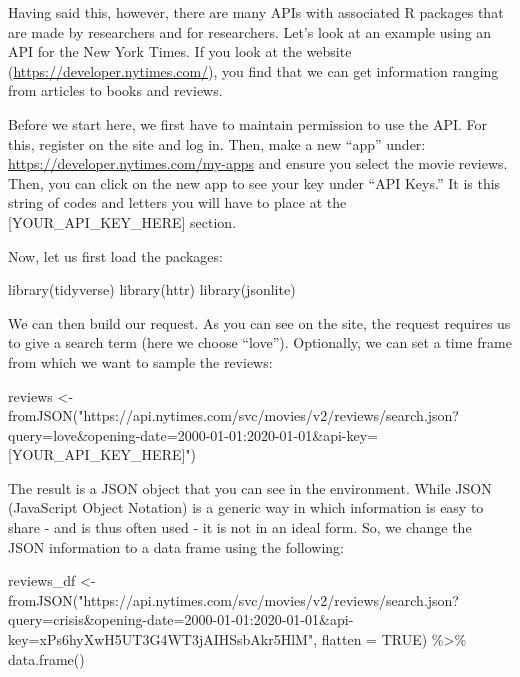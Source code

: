 \documentclass[
]{book}
\newenvironment{Shaded}{\begin{snugshade}}{\end{snugshade}}
\newcommand{\AttributeTok}[1]{\textcolor[rgb]{0.77,0.63,0.00}{#1}}
\newcommand{\ConstantTok}[1]{\textcolor[rgb]{0.00,0.00,0.00}{#1}}
\newcommand{\FunctionTok}[1]{\textcolor[rgb]{0.00,0.00,0.00}{#1}}
\newcommand{\NormalTok}[1]{#1}
\newcommand{\OtherTok}[1]{\textcolor[rgb]{0.56,0.35,0.01}{#1}}
\newcommand{\SpecialCharTok}[1]{\textcolor[rgb]{0.00,0.00,0.00}{#1}}
\newcommand{\StringTok}[1]{\textcolor[rgb]{0.31,0.60,0.02}{#1}}
\begin{document}
Having said this, however, there are many APIs with associated R packages that are made by researchers and for researchers. Let's look at an example using an API for the New York Times. If you look at the website (\url{https://developer.nytimes.com/}), you find that we can get information ranging from articles to books and reviews.

Before we start here, we first have to maintain permission to use the API. For this, register on the site and log in. Then, make a new ``app'' under: \url{https://developer.nytimes.com/my-apps} and ensure you select the movie reviews. Then, you can click on the new app to see your key under ``API Keys.'' It is this string of codes and letters you will have to place at the {[}YOUR\_API\_KEY\_HERE{]} section.

Now, let us first load the packages:

\begin{Shaded}
\begin{Highlighting}[]
\FunctionTok{library}\NormalTok{(tidyverse)}
\FunctionTok{library}\NormalTok{(httr)}
\FunctionTok{library}\NormalTok{(jsonlite)}
\end{Highlighting}
\end{Shaded}

We can then build our request. As you can see on the site, the request requires us to give a search term (here we choose ``love''). Optionally, we can set a time frame from which we want to sample the reviews:

\begin{Shaded}
\begin{Highlighting}[]
\NormalTok{reviews }\OtherTok{\textless{}{-}}  \FunctionTok{fromJSON}\NormalTok{(}\StringTok{"https://api.nytimes.com/svc/movies/v2/reviews/search.json?query=love\&opening{-}date=2000{-}01{-}01:2020{-}01{-}01\&api{-}key=[YOUR\_API\_KEY\_HERE]"}\NormalTok{)}
\end{Highlighting}
\end{Shaded}

The result is a JSON object that you can see in the environment. While JSON (JavaScript Object Notation) is a generic way in which information is easy to share - and is thus often used - it is not in an ideal form. So, we change the JSON information to a data frame using the following:

\begin{Shaded}
\begin{Highlighting}[]
\NormalTok{reviews\_df }\OtherTok{\textless{}{-}}  \FunctionTok{fromJSON}\NormalTok{(}\StringTok{"https://api.nytimes.com/svc/movies/v2/reviews/search.json?query=crisis\&opening{-}date=2000{-}01{-}01:2020{-}01{-}01\&api{-}key=xPs6hyXwH5UT3G4WT3jAIHSsbAkr5HlM"}\NormalTok{, }\AttributeTok{flatten =} \ConstantTok{TRUE}\NormalTok{) }\SpecialCharTok{\%\textgreater{}\%} 
        \FunctionTok{data.frame}\NormalTok{()}
\end{Highlighting}
\end{Shaded}
\end{document}

